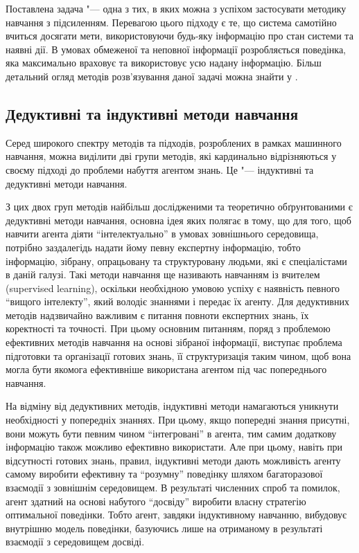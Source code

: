 Поставлена задача "--- одна з тих, в яких можна з успіхом застосувати методику навчання з підсиленням. Перевагою цього підходу є те, що система самотійно вчиться досягати мети, використовуючи будь-яку інформацію про стан системи та наявні дії. В умовах обмеженої та неповної інформації розробляється поведінка, яка максимально враховує та використовує усю надану інформацію. Більш детальний огляд методів розв'язування даної задачі можна знайти у \cite{Rummery1995}.

\subsection{Дедуктивні та індуктивні методи навчання}

Серед широкого спектру методів та підходів, розроблених в рамках машинного навчання, можна виділити дві групи методів, які кардинально відрізняються у своєму підході до проблеми набуття агентом знань. Це "--- індуктивні та дедуктивні методи навчання.

З цих двох груп методів найбільш дослідженими та теоретично обґрунтованими є дедуктивні методи навчання, основна ідея яких полягає в тому, що для того, щоб навчити агента діяти ``інтелектуально'' в умовах зовнішнього середовища, потрібно заздалегідь надати йому певну експертну інформацію, тобто інформацію, зібрану, опрацьовану та структуровану людьми, які є спеціалістами в даній галузі. Такі методи навчання ще називають навчанням із вчителем (supervised learning), оскільки необхідною умовою успіху є наявність певного ``вищого інтелекту'', який володіє знаннями і передає їх агенту. Для дедуктивних методів надзвичайно важливим є питання повноти експертних знань, їх коректності та точності. При цьому основним питанням, поряд з проблемою ефективних методів навчання на основі зібраної інформації, виступає проблема підготовки та організації готових знань, її структуризація таким чином, щоб вона могла бути якомога ефективніше використана агентом під час попереднього навчання.

На відміну від дедуктивних методів, індуктивні методи намагаються уникнути необхідності у попередніх знаннях. При цьому, якщо попередні знання присутні, вони можуть бути певним чином ``інтегровані'' в агента, тим самим додаткову інформацію також можливо ефективно використати. Але при цьому, навіть при відсутності готових знань, правил, індуктивні методи дають можливість агенту самому виробити ефективну та ``розумну'' поведінку шляхом багаторазової взаємодії з зовнішнім середовищем. В результаті численних спроб та помилок, агент здатний на основі набутого ``досвіду'' виробити власну стратегію оптимальної поведінки. Тобто агент, завдяки індуктивному навчанню, вибудовує внутрішню модель поведінки, базуючись лише на отриманому в результаті взаємодії з середовищем досвіді.


